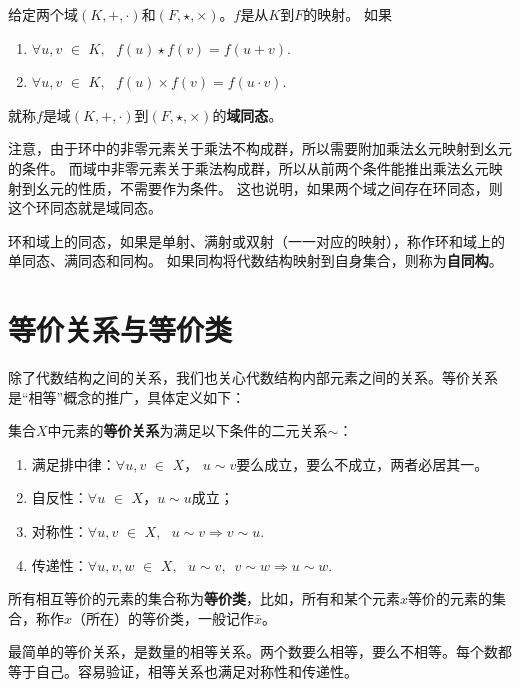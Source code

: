 \documentclass[12pt,UTF8]{ctexbook}
\begin{document}
\begin{appendix}
\begin{df}\label{df:0_6}
    给定两个域$(K, +, \cdot )$和$(F, \star , \times)$。$f$是从$K$到$F$的映射。
    如果
    \begin{enumerate}
        \item $\forall u, v \,\, \in \,\, K, \,\,\,\, f(u) \star f(v) = f(u + v).$
        \item $\forall u, v \,\, \in \,\, K, \,\,\,\, f(u) \times f(v) = f(u \cdot v).$
    \end{enumerate}
    就称$f$是域$(K, +, \cdot )$到$(F, \star , \times)$的\textbf{域同态}。
\end{df}

注意，由于环中的非零元素关于乘法不构成群，所以需要附加乘法幺元映射到幺元的条件。
而域中非零元素关于乘法构成群，所以从前两个条件能推出乘法幺元映射到幺元的性质，不需要作为条件。
这也说明，如果两个域之间存在环同态，则这个环同态就是域同态。

环和域上的同态，如果是单射、满射或双射（一一对应的映射），称作环和域上的单同态、满同态和同构。
如果同构将代数结构映射到自身集合，则称为\textbf{自同构}。

\section{等价关系与等价类}
除了代数结构之间的关系，我们也关心代数结构内部元素之间的关系。等价关系是“相等”概念的推广，具体定义如下：

\begin{df}\label{df:0_6b}
    集合$X$中元素的\textbf{等价关系}为满足以下条件的二元关系$\sim$：
    \begin{enumerate}
        \item 满足排中律：$\forall u, v \,\, \in \,\, X$， $u \sim v$要么成立，要么不成立，两者必居其一。
        \item 自反性：$\forall u \,\, \in \,\, X$，$u \sim u$成立；
        \item 对称性：$\forall u, v \,\, \in \,\, X, \,\,\,\, u \sim v \Rightarrow v \sim u.$
        \item 传递性：$\forall u, v, w \,\, \in \,\, X, \,\,\,\, u \sim v, \,\,\, v \sim w \Rightarrow u \sim w.$
    \end{enumerate}
\end{df}

所有相互等价的元素的集合称为\textbf{等价类}，比如，所有和某个元素$x$等价的元素的集合，称作$x$（所在）的等价类，一般记作$\bar{x}$。

最简单的等价关系，是数量的相等关系。两个数要么相等，要么不相等。每个数都等于自己。容易验证，相等关系也满足对称性和传递性。


\end{appendix}
\end{document}
